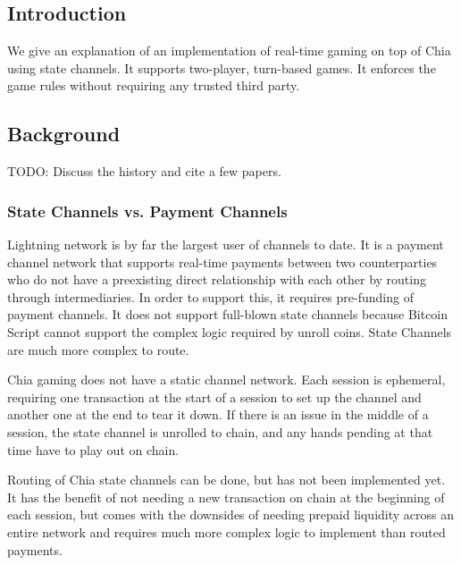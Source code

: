 \documentclass[a4paper]{article}
\begin{document}
\begin{multicols}{2}
\setlength{\columnsep}{0.5cm}

\section{Introduction}
We give an explanation of an implementation of real-time gaming on top of Chia using state channels. It supports two-player, turn-based games. It enforces the game rules without requiring any trusted third party.

\subsection{Background}
TODO: Discuss the history and cite a few papers. 

\subsubsection{State Channels vs. Payment Channels}
Lightning network \cite{1} is by far the largest user of channels to date. It is a payment channel network that supports real-time payments between two counterparties who do not have a preexisting direct relationship with each other by routing through intermediaries. In order to support this, it requires pre-funding of payment channels. It does not support full-blown state channels because Bitcoin Script cannot support the complex logic required by unroll coins. State Channels are much more complex to route. 

Chia gaming does not have a static channel network. Each session is ephemeral, requiring one transaction at the start of a session to set up the channel and another one at the end to tear it down. If there is an issue in the middle of a session, the state channel is unrolled to chain, and any hands pending at that time have to play out on chain.

Routing of Chia state channels can be done, but has not been implemented yet. It has the benefit of not needing a new transaction on chain at the beginning of each session, but comes with the downsides of needing prepaid liquidity across an entire network and requires much more complex logic to implement than routed payments.



\end{multicols}
\end{document}
